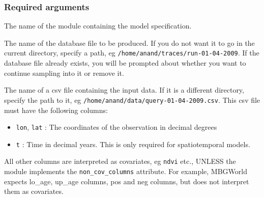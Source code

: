 \subsubsection{Required arguments}
\label{sec:required-arguments}
\begin{list}{.}
{
\setlength{\rightmargin}{\leftmargin}
}
\item {} 
The name of the module containing the model specification.

\item {} 
The name of the database file to be produced. If you do not want it to go in the current
directory, specify a path, eg \texttt{/home/anand/traces/run-01-04-2009}. If the database file
already exists, you will be prompted about whether you want to continue sampling into it
or remove it.

\item {} 
The name of a csv file containing the input data. If it is a different directory, specify
the path to it, eg \texttt{/home/anand/data/query-01-04-2009.csv}. This csv file must have the
following columns:
\begin{itemize}
\item {} 
\texttt{lon}, \texttt{lat} : The coordinates of the observation in decimal degrees

\item {} 
\texttt{t} : Time in decimal years. This is only required for spatiotemporal models.

\end{itemize}

All other columns are interpreted as covariates, eg \texttt{ndvi} etc., UNLESS the module
implements the \texttt{non{\_}cov{\_}columns} attribute. For example, MBGWorld expects
lo{\_}age, up{\_}age columns, pos and neg columns, but does not interpret them as covariates.

\end{list}





